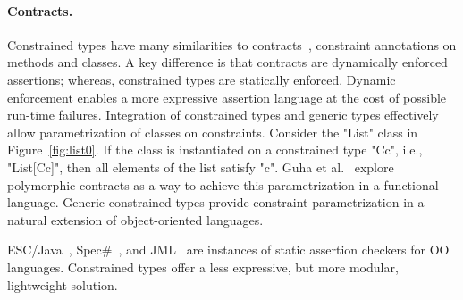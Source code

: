 \paragraph{Contracts.}

Constrained types have many similarities to
contracts~\cite{Parnas72,eiffel,Findler02},
constraint annotations on methods and classes.
A key difference is that contracts are dynamically enforced
assertions; whereas, constrained types are statically enforced.
Dynamic enforcement enables a more expressive assertion language
at the cost of possible run-time failures.
Integration of constrained types and generic types
effectively allow parametrization of classes on constraints.
Consider the \xcd"List" class in Figure~\ref{fig:list0}.
If the class is instantiated on a constrained type \xcd"C{c}",
i.e., \xcd"List[C{c}]",
then all elements of the list satisfy \xcd"c".
Guha et al.~\cite{GMFK07} 
explore polymorphic contracts as a way to achieve this
parametrization in a functional language.
Generic constrained types provide constraint parametrization
in a natural extension of object-oriented languages.

ESC/Java~\cite{escjava-pldi02}, Spec\#~\cite{specsharp}, and
JML~\cite{leavens00jml} are instances of
static assertion checkers for OO languages.  Constrained types
offer a less expressive, but more modular, lightweight solution.


